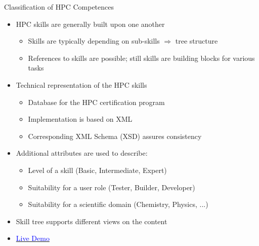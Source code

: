 \documentclass[compress,aspectratio=169]{beamer}
\newcommand{\hrefb}[2]{\href{#1}{\textcolor{blue}{#2}}}
\begin{document}
\begin{frame}{Classification of HPC Competences}
	\begin{itemize}
		\item HPC skills are generally built upon one another
		\begin{itemize}
			\item Skills are typically depending on sub-skills $\Rightarrow$ tree structure
			\item References to skills are possible; still skills are building blocks for various tasks
		\end{itemize}
		\item Technical representation of the HPC skills
		\begin{itemize}
			\item Database for the HPC certification program
			\item Implementation is based on XML
			\item Corresponding XML Schema (XSD) assures consistency
		\end{itemize}

		\item Additional attributes are used to describe:
		\begin{itemize}
			\item Level of a skill (Basic, Intermediate, Expert)
			\item Suitability for a user role (Tester, Builder, Developer)
			\item Suitability for a scientific domain (Chemistry, Physics, ...)
		\end{itemize}
		\item Skill tree supports different views on the content
		\item \hrefb{https://www.hpc-certification.org/skills/}{Live Demo}
	\end{itemize}
\end{frame}
\end{document}
